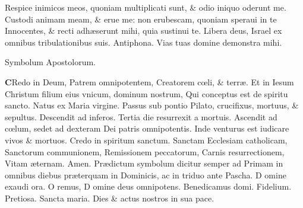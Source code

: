 \documentclass[a5paper,10pt]{book}
\def\ae{æ}
\def\oe{œ}
\begin{document}
\begin{multicols*}{2}
\newline \color{red} R\color{black}espice inimicos meos, quoniam multiplicati sunt, \& odio iniquo oderunt me.
\newline \color{red} C\color{black}ustodi animam meam, \& erue me: non erubescam, quoniam speraui in te%
\newline \color{red} I\color{black}nnocentes, \& recti adh\ae serunt mihi, quia sustinui te.
\newline \color{red} L\color{black}ibera deus, Israel ex omnibus tribulationibus suis. \quad \color{red} Antiphona. \color{black} Vias tuas domine demonstra mihi. \color{black}
\vspace{-1em}
\begin{center} \color{red}
Symbolum Apostolorum.
\end{center}
\vspace{-1em}
\lettrine[lines=2]{\bfseries \color{red} C}{}Redo in Deum, 
\color{red} P\color{black}atrem omnipotentem,
\color{red} C\color{black}reatorem c\oe li, \& terr\ae .
\color{red} E\color{black}t in Iesum Christum filium eius vnicum, dominum nostrum,
\color{red} Q\color{black}ui conceptus est de spiritu sancto.
\color{red} N\color{black}atus ex Maria virgine.
\color{red} P\color{black}assus sub pontio Pilato, crucifixus, mortuus, \& sepultus.
\color{red} D\color{black}escendit ad inferos.
\color{red} T\color{black}ertia die resurrexit a mortuis.
\color{red} A\color{black}scendit ad c\oe lum, sedet ad dexteram Dei patris omnipotentis.
\color{red} I\color{black}nde venturus est iudicare vivos \& mortuos.
\newline \color{red} C\color{black}redo in spiritum sanctum.
\newline \color{red} S\color{black}anctam Ecclesiam catholicam,
\newline \color{red} S\color{black}anctorum communionem,
\newline \color{red} R\color{black}emissionem peccatorum,
\newline \color{red} C\color{black}arnis resurrectionem,
\newline \color{red} V\color{black}itam \ae ternam. Amen.
\newline {} \color{red} Pr\ae dictum symbolum dicitur semper ad Primam in omnibus diebus pr\ae terquam in Dominicis, ac in triduo ante Pascha. \color{black}
\newline \color{red} D\color{black} omine exaudi ora. \color{red} O\color{black} remus, \color{red} D\color{black} omine deus omnipotens. Benedicamus domi. Fidelium. Pretiosa. Sancta maria. Dies \& actus nostros in sua pace.

\end{multicols*}
\end{document}
